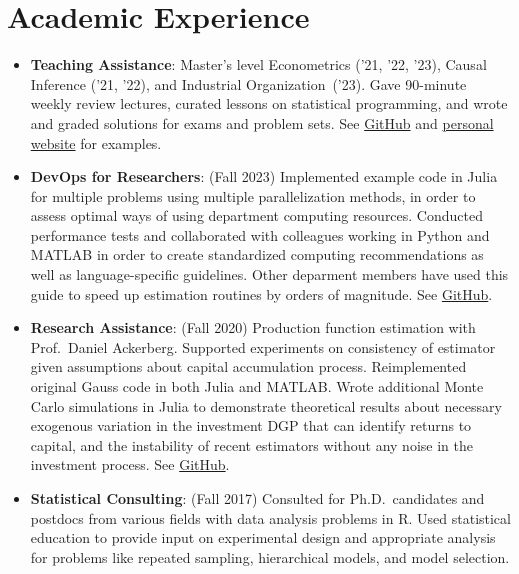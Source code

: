 \documentclass[a4paper,20pt]{article}
\newcommand{\resumeItem}[2]{
  \item\small{
    \textbf{#1}{: #2 \vspace{-2pt}}
  }
}
\newcommand{\resumeSubItem}[2]{\resumeItem{#1}{#2}\vspace{-3pt}}
\newcommand{\resumeSubHeadingListEnd}{\end{itemize}}
\begin{document}
\begin{itemize}[leftmargin=*, itemindent=-9em]
\resumeSubHeadingListEnd

\vspace{-5pt}\section{Academic Experience}
\begin{itemize}[leftmargin=*, itemindent=-12pt]
  \resumeSubItem{Teaching Assistance}{Master's level Econometrics ('21, '22, '23), Causal Inference ('21, '22), and Industrial Organization~('23). Gave 90-minute weekly review lectures, curated lessons on statistical programming, and wrote and graded solutions for exams and problem sets. See \href{https://github.com/nateybear/causal-inference-2022}{GitHub} and \href{https://pages.nghattersley.net/metrics-in-r}{personal website} for examples.}
\resumeSubItem{DevOps for Researchers}{(Fall 2023) Implemented example code in Julia for multiple problems using multiple parallelization methods, in order to assess optimal ways of using department computing resources. Conducted performance tests and collaborated with colleagues working in Python and MATLAB in order to create standardized computing recommendations as well as language-specific guidelines. Other deparment members have used this guide to speed up estimation routines by orders of magnitude. See \href{https://github.com/nateybear/parallel-racers/wiki}{GitHub}.}
\resumeSubItem{Research Assistance}{(Fall 2020) Production function estimation with Prof.\ Daniel Ackerberg. Supported experiments on consistency of estimator given assumptions about capital accumulation process. Reimplemented original Gauss code in both Julia and MATLAB. Wrote additional Monte Carlo simulations in Julia to demonstrate theoretical results about necessary exogenous variation in the investment DGP that can identify returns to capital, and the instability of recent estimators without any noise in the investment process. See \href{https://github.com/nateybear/production-functions.jl}{GitHub}.}
\vspace{2pt}
\resumeSubItem{Statistical Consulting}{(Fall 2017) Consulted for Ph.D.\ candidates and postdocs from various fields with data analysis problems in R. Used statistical education to provide input on experimental design and appropriate analysis for problems like repeated sampling, hierarchical models, and model selection.}
\resumeSubHeadingListEnd
\vspace{-5pt}
\end{document}
